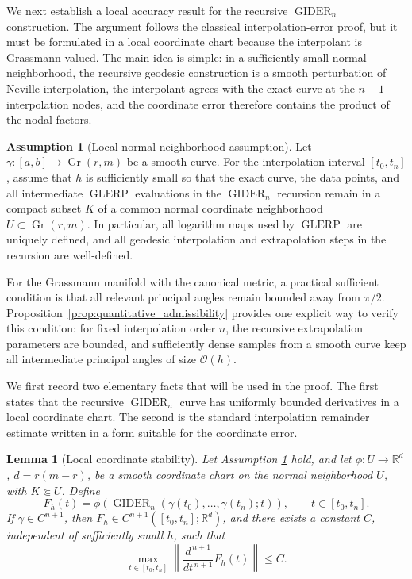\documentclass[a4paper,11pt]{article}
\newcommand{\bR}{\mathbb{R}}
\DeclareMathOperator{\Gr}{Gr}
\newcommand{\GLERP}{\operatorname{GLERP}}
\newcommand{\GIDER}{\operatorname{GIDER}}
\numberwithin{equation}{section}
\theoremstyle{plain}
\newtheorem{lemma}[thm]{Lemma}
\theoremstyle{definition}
\newtheorem{assump}[thm]{Assumption}
\theoremstyle{remark}
\begin{document}
We next establish a local accuracy result for the recursive \(\GIDER_n\) construction.  The argument follows the classical interpolation-error proof, but it must be formulated in a local coordinate chart because the interpolant is Grassmann-valued.  The main idea is simple: in a sufficiently small normal neighborhood, the recursive geodesic construction is a smooth perturbation of Neville interpolation, the interpolant agrees with the exact curve at the \(n+1\) interpolation nodes, and the coordinate error therefore contains the product of the nodal factors.

\begin{assump}[Local normal-neighborhood assumption]\label{assump:normal}
Let \(\gamma:[a,b]\to\Gr(r,m)\) be a smooth curve.  For the interpolation interval \([t_0,t_n]\), assume that \(h\) is sufficiently small so that the exact curve, the data points, and all intermediate \(\GLERP\) evaluations in the \(\GIDER_n\) recursion remain in a compact subset \(K\) of a common normal coordinate neighborhood \(U\subset\Gr(r,m)\).  In particular, all logarithm maps used by \(\GLERP\) are uniquely defined, and all geodesic interpolation and extrapolation steps in the recursion are well-defined.
\end{assump}

For the Grassmann manifold with the canonical metric, a practical sufficient condition is that all relevant principal angles remain bounded away from \(\pi/2\).  Proposition~\ref{prop:quantitative_admissibility} provides one explicit way to verify this condition: for fixed interpolation order \(n\), the recursive extrapolation parameters are bounded, and sufficiently dense samples from a smooth curve keep all intermediate principal angles of size \(\mathcal{O}(h)\).

We first record two elementary facts that will be used in the proof.  The first states that the recursive \(\GIDER_n\) curve has uniformly bounded derivatives in a local coordinate chart.  The second is the standard interpolation remainder estimate written in a form suitable for the coordinate error.

\begin{lemma}[Local coordinate stability]\label{lemma:local_stability}
Let Assumption \ref{assump:normal} hold, and let \(\phi:U\to\bR^d\), \(d=r(m-r)\), be a smooth coordinate chart on the normal neighborhood \(U\), with \(K\Subset U\).  Define
\[
    F_h(t)
    =
    \phi\left(\GIDER_n(\gamma(t_0),\ldots,\gamma(t_n);t)\right),
    \qquad t\in[t_0,t_n].
\]
If \(\gamma\in C^{n+1}\), then \(F_h\in C^{n+1}([t_0,t_n];\bR^d)\), and there exists a constant \(C\), independent of sufficiently small \(h\), such that
\[
    \max_{t\in[t_0,t_n]}
    \left\|
        \frac{d^{\,n+1}}{dt^{\,n+1}}F_h(t)
    \right\|
    \le C.
\]
\end{lemma}
\end{document}
